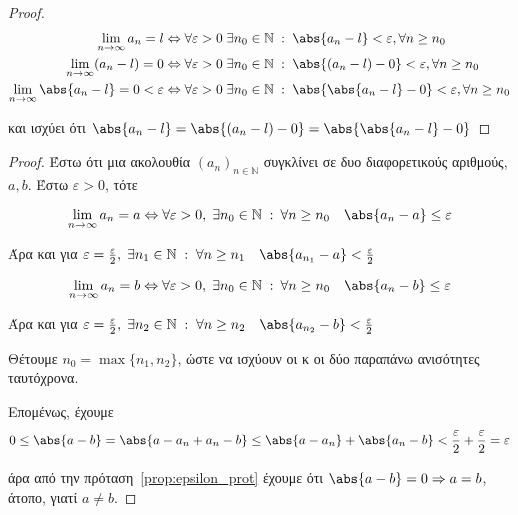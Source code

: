 \documentclass[main.tex]{subfiles}
\begin{document}

\begin{proof}
\item {}
  \begin{align*} 
    \lim_{n \to \infty} a_{n}= l & \Leftrightarrow \forall 
    \varepsilon > 0 \; \exists n_{0} \in \mathbb{N} \; : \; 
    \abs{a_{n}-l} < \varepsilon, \forall n \geq n_{0} \\ 
    \lim_{n \to \infty} (a_{n}-l) = 0 & \Leftrightarrow \forall 
    \varepsilon >0 \; \exists n_{0} \in \mathbb{N} \; : \; 
    \abs {(a_{n}-l) - 0} < \varepsilon , \forall n \geq n_{0} \\
    \lim_{n \to \infty} \abs{a_{n}-l}=0 < \varepsilon & \Leftrightarrow 
    \forall \varepsilon > 0 \; \exists n_{0} \in \mathbb{N} 
    \; : \; \abs {\abs{a_{n}- l } - 0} < \varepsilon, \forall n \geq 
    n_{0} 
  \end{align*}

  και ισχύει ότι $ \abs{a_{n}-l} = \abs{(a_{n}-l)-0} = 
  \abs{\abs{a_{n}- l} -0} $
\end{proof}


\begin{proof}
\item {}
  Έστω ότι μια ακολουθία $ (a_{n})_{n \in \mathbb{N}} $ συγκλίνει σε 
  δυο διαφορετικούς αριθμούς, $ a,b $. Έστω $ \varepsilon >0 $, τότε

  \[ 
    \lim_{n \to \infty} a_{n} = a \Leftrightarrow \forall 
    \varepsilon > 0, \; \exists n_{0} \in \mathbb{N} \; : \: 
    \forall n \geq n_{0} \quad \abs{a_{n}- a} \leq \varepsilon 
  \]

  Άρα και για $ \varepsilon = \frac{\varepsilon}{2}, \; \exists n_{1} \in 
  \mathbb{N} \; : \; \forall n \geq n_{1} \quad \abs{a_{n_{1}} - a} 
  < \frac{\varepsilon}{2}  $

  \[ 
    \lim_{n \to \infty} a_{n} = b \Leftrightarrow \forall 
    \varepsilon > 0, \; \exists n_{0} \in \mathbb{N} \; : \: 
    \forall n \geq n_{0} \quad \abs{a_{n}- b} \leq \varepsilon 
  \]

  Άρα και για $ \varepsilon = \frac{\varepsilon}{2}, \; \exists n_{2} \in 
  \mathbb{N} \; : \; \forall n \geq n_{2}  \quad 
  \abs{a_{n_{2}} - b} < \frac{\varepsilon}{2}  $

  Θέτουμε $ n_{0} = \max \{ n_{1}, n_{2} \} $, ώστε να ισχύουν οι 
  κ οι δύο παραπάνω ανισότητες ταυτόχρονα. 

  Επομένως, έχουμε 
  \[
    0 \leq \abs{a-b} = \abs{a- a_{n}+ a_{n}- b} \leq 
    \abs{a- a_{n}} + \abs{a_{n}- b} < \frac{\varepsilon}{2} + 
    \frac{\varepsilon}{2} = \varepsilon 
  \] 

  άρα από την πρόταση~\ref{prop:epsilon_prot} έχουμε ότι 
  $ \abs{a-b} = 0 \Rightarrow a=b $, άτοπο, γιατί $ a \neq b $.
\end{proof}
\end{document}
